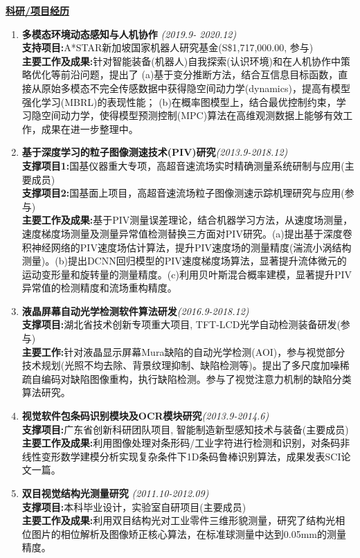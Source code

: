 \documentclass[a4paper,fontsize=11pt]{scrartcl} %
\newcommand{\stitle}[1]{
	\noindent\underline{\textbf{#1}} \normalsize\par}
\begin{document}
\stitle{科研/项目经历}
\begin{enumerate}
	\setlength\itemsep{0.0cm}
	\item \textbf{多模态环境动态感知与人机协作} \hfill \textit{(2019.9- 2020.12)}\\
	\textbf{支持项目:}A*STAR新加坡国家机器人研究基金(S\$1,717,000.00, 参与)\\
    \textbf{主要工作及成果:}针对智能装备(机器人)自我探索(认识环境)和在人机协作中策略优化等前沿问题，提出了
	(a)基于变分推断方法，结合互信息目标函数，直接从原始多模态不完全传感数据中获得隐空间动力学(dynamics)，提高有模型强化学习(MBRL)的表现性能；
    (b)在概率图模型上，结合最优控制约束，学习隐空间动力学，使得模型预测控制(MPC)算法在高维观测数据上能够有效工作，成果在进一步整理中。
    \item \textbf{基于深度学习的粒子图像测速技术(PIV)研究}\hfill \textit{(2013.9-2018.12)}\\
	\textbf{支撑项目1:}国基仪器重大专项，高超音速流场实时精确测量系统研制与应用(主要成员)\\
	\textbf{支撑项目2:}国基面上项目，高超音速流场粒子图像测速示踪机理研究与应用(参与)\\
	\textbf{主要工作及成果:}基于PIV测量误差理论，结合机器学习方法，从速度场测量，速度梯度场测量及测量异常值检测替换三方面对PIV研究。(a)提出基于深度卷积神经网络的PIV速度场估计算法，提升PIV速度场的测量精度(湍流小涡结构测量)。(b)提出DCNN回归模型的PIV速度梯度场算法，显著提升流体微元的运动变形量和旋转量的测量精度。(c)利用贝叶斯混合概率建模，显著提升PIV异常值的检测精度和流场重构精度。
\item \textbf{液晶屏幕自动光学检测软件算法研发}\hfill	\textit{(2016.9-2018.12)}\\
\textbf{支撑项目:}湖北省技术创新专项重大项目, TFT-LCD光学自动检测装备研发(参与)\\
\textbf{主要工作:}针对液晶显示屏幕Mura缺陷的自动光学检测(AOI)，参与视觉部分技术规划(光照不均去除、背景纹理抑制、缺陷检测等)。提出了多尺度加噪稀疏自编码对缺陷图像重构，执行缺陷检测。参与了视觉注意力机制的缺陷分类算法研究。
\item \textbf{视觉软件包条码识别模块及OCR模块研究}\hfill \textit{(2013.9-2014.6)}\\
\textbf{支撑项目:}广东省创新科研团队项目, 智能制造新型感知技术与装备(主要成员)\\
\textbf{主要工作及成果:}利用图像处理对条形码/工业字符进行检测和识别，对条码非线性变形数学建模分析实现复杂条件下1D条码鲁棒识别算法，成果发表SCI论文一篇。
\item \textbf{双目视觉结构光测量研究	}\hfill \textit{(2011.10-2012.09)}\\
\textbf{支撑项目:}本科毕业设计，实验室自研项目(主要成员)\\
\textbf{主要工作及成果:}利用双目结构光对工业零件三维形貌测量，研究了结构光相位图片的相位解析及图像矫正核心算法，在标准球测量中达到0.05mm的测量精度。
\end{enumerate}
\end{document}
